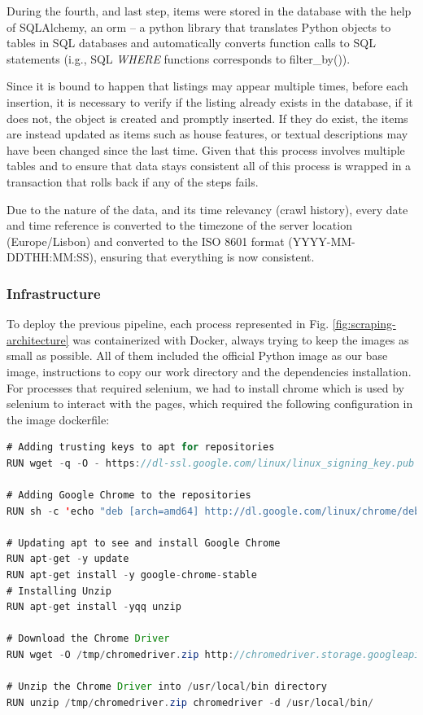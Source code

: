 During the fourth, and last step, items were stored in the database with the help of SQLAlchemy, an \acrfull{orm} -- a python library that translates Python objects to tables in SQL databases and automatically converts function calls to SQL statements (i.g., SQL \textit{WHERE} functions corresponds to filter\_by()). 

Since it is bound to happen that listings may appear multiple times, before each insertion, it is necessary to verify if the listing already exists in the database, if it does not, the object is created and promptly inserted. If they do exist, the items are instead updated as items such as house features, or textual descriptions may have been changed since the last time. Given that this process involves multiple tables and to ensure that data stays consistent all of this process is wrapped in a transaction that rolls back if any of the steps fails.

Due to the nature of the data, and its time relevancy (crawl history), every date and time reference is converted to the timezone of the server location (Europe/Lisbon) and converted to the ISO 8601 format (YYYY-MM-DDTHH:MM:SS), ensuring that everything is now consistent. \\

\subsubsection{Infrastructure}
\label{sss:scraping-infrastructure}

To deploy the previous pipeline, each process represented in Fig. \ref{fig:scraping-architecture} was containerized with Docker, always trying to keep the images as small as possible. All of them included the official Python image as our base image, instructions to copy our work directory and the dependencies installation. For processes that required selenium, we had to install chrome which is used by selenium to interact with the pages, which required the following configuration in the image dockerfile:

\begin{lstlisting}[float, language=Java, caption={Dockerfile configuration of the scrapper}, captionpos=t]
# Adding trusting keys to apt for repositories
RUN wget -q -O - https://dl-ssl.google.com/linux/linux_signing_key.pub | apt-key add -

# Adding Google Chrome to the repositories
RUN sh -c 'echo "deb [arch=amd64] http://dl.google.com/linux/chrome/deb/ stable main" >> /etc/apt/sources.list.d/google-chrome.list'

# Updating apt to see and install Google Chrome
RUN apt-get -y update
RUN apt-get install -y google-chrome-stable
# Installing Unzip
RUN apt-get install -yqq unzip

# Download the Chrome Driver
RUN wget -O /tmp/chromedriver.zip http://chromedriver.storage.googleapis.com/`curl -sS chromedriver.storage.googleapis.com/LATEST_RELEASE`/chromedriver_linux64.zip

# Unzip the Chrome Driver into /usr/local/bin directory
RUN unzip /tmp/chromedriver.zip chromedriver -d /usr/local/bin/
\end{lstlisting}

